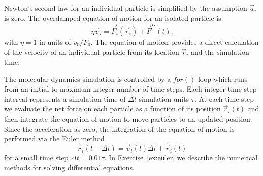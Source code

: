 \documentclass[twocolumn,preprintnumbers,amsmath,amssymb,aps,prx]{revtex4}
\begin{document}
Newton's second law for an individual particle
is simplified
by the assumption $\vec{a}_i$ is zero. %
The overdamped equation of motion for an isolated particle is
\begin{equation}
  \eta \vec{v}_i = \vec{F}^l_{i}(\vec{r}_i) + \vec{F}^{D}(t).
    \label{eq:motion}
\end{equation}
with  $\eta = 1$ in units of $v_0 / F_0$. 
The equation of motion provides a direct calculation of the velocity
of an individual particle from its location $\vec{r}_i$ %
and the simulation time.

The molecular dynamics simulation is controlled by a $for()$ loop
which runs from an initial to maximum integer number of time steps.
Each integer time step interval %
represents a simulation time of $\Delta t$ 
simulation units $\tau$.  %
At each time step
we evaluate the net force on each particle as a function of its position
$\vec{r}_i(t)$
and then integrate
the equation of motion to move particles
to an updated position.
Since the acceleration as zero,
the integration of the equation of motion
is performed via 
the Euler method 
\begin{equation}
  \vec{r}_i(t+\Delta t) = \vec{v}_i(t) \Delta t + \vec{r}_i(t)
    \label{eq:euler}
\end{equation}
for a small time step $\Delta t = 0.01 \tau$.
In %
Exercise~\ref{ex:euler}
we describe 
the numerical methods for 
solving differential equations.
%
\end{document}
